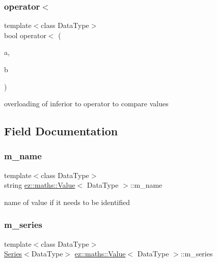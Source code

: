\subsubsection{\texorpdfstring{operator$<$}{operator<}}
{\footnotesize\ttfamily template$<$class Data\+Type$>$ \\
bool operator$<$ (\begin{DoxyParamCaption}\item[{const \hyperlink{classez_1_1maths_1_1Value}{Value}$<$ Data\+Type $>$ \&}]{a,  }\item[{const \hyperlink{classez_1_1maths_1_1Value}{Value}$<$ Data\+Type $>$ \&}]{b }\end{DoxyParamCaption})\hspace{0.3cm}{\ttfamily [friend]}}

overloading of inferior to operator to compare values 

\subsection{Field Documentation}
\mbox{\label{classez_1_1maths_1_1Value_a2ee76ebdeaa2dd1d8180cc40811ea36c}} 
\subsubsection{\texorpdfstring{m\+\_\+name}{m\_name}}
{\footnotesize\ttfamily template$<$class Data\+Type$>$ \\
string \hyperlink{classez_1_1maths_1_1Value}{ez\+::maths\+::\+Value}$<$ Data\+Type $>$\+::m\+\_\+name}

name of value if it needs to be identified \mbox{\label{classez_1_1maths_1_1Value_a3bfd4fd59073f378c85d688bee3cb363}} 
\subsubsection{\texorpdfstring{m\+\_\+series}{m\_series}}
{\footnotesize\ttfamily template$<$class Data\+Type$>$ \\
\hyperlink{classez_1_1maths_1_1Series}{Series}$<$Data\+Type$>$ \hyperlink{classez_1_1maths_1_1Value}{ez\+::maths\+::\+Value}$<$ Data\+Type $>$\+::m\+\_\+series}

